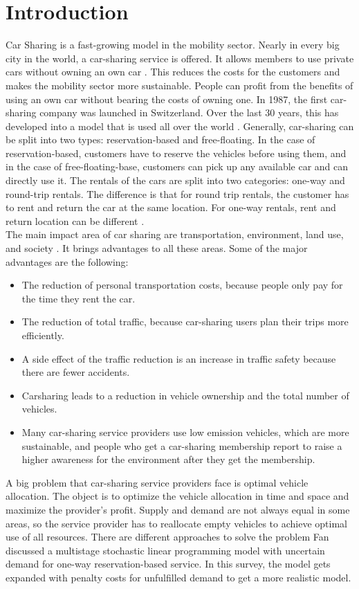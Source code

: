 \section{Introduction}
Car Sharing is a fast-growing model in the mobility sector. Nearly in every big city in the world, a car-sharing service is offered. It allows members to use private cars without owning an own car \cite{Bardhi_1}. This reduces the costs for the customers and makes the mobility sector more sustainable. People can profit from the benefits of using an own car without bearing the costs of owning one. In 1987, the first car-sharing company was launched in Switzerland. Over the last 30 years, this has developed into a model that is used all over the world \cite{Sus_1}. Generally, car-sharing can be split into two types: reservation-based and free-floating. In the case of reservation-based, customers have to reserve the vehicles before using them, and in the case of free-floating-base, customers can pick up any available car and can directly use it. The rentals of the cars are split into two categories: one-way and round-trip rentals. The difference is that for round trip rentals, the customer has to rent and return the car at the same location. For one-way rentals, rent and return location can be different \cite{Yu_1}.\\
The main impact area of car sharing are transportation, environment, land use, and society \cite{Sus_1}. It brings advantages to all these areas. Some of the major advantages are the following:
\begin{itemize}
\item The reduction of personal transportation costs, because people only pay for the time they rent the car.\cite{Sus_2}
\item The reduction of total traffic, because car-sharing users plan their trips more efficiently. \cite{Cooper_1}
\item A side effect of the traffic reduction is an increase in traffic safety because there are fewer accidents. \cite{Cooper_1}
\item Carsharing leads to a reduction in vehicle ownership and the total number of vehicles.\cite{MACEDO2017731}
\item Many car-sharing service providers use low emission vehicles, which are more sustainable, and people who get a car-sharing membership report to raise a higher awareness for the environment after they get the membership.\cite{Sus_2,lane_1}
\end{itemize}
A big problem that car-sharing service providers face is optimal vehicle allocation. The object is to optimize the vehicle allocation in time and space and maximize the provider's profit. Supply and demand are not always equal in some areas, so the service provider has to reallocate empty vehicles to achieve optimal use of all resources. There are different approaches to solve the problem Fan\cite{Wei_1} discussed a multistage stochastic linear programming model with uncertain demand for one-way reservation-based service. In this survey, the model gets expanded with penalty costs for unfulfilled demand to get a more realistic model.\\
